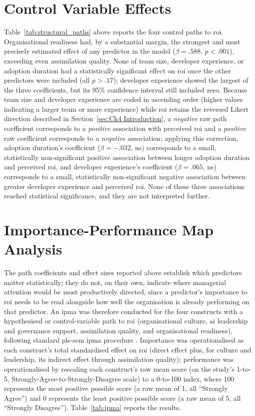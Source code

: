 \section{Control Variable Effects}
\label{sec:Control Variable Effects}
Table~\ref{tab:structural_paths} above reports the four control paths to \gls{roi}. Organisational readiness had, by a substantial margin, the strongest and most precisely estimated effect of any predictor in the model ($\beta = .588$, $p < .001$), exceeding even assimilation quality. None of team size, developer experience, or adoption duration had a statistically significant effect on \gls{roi} once the other predictors were included (all $p > .17$); developer experience showed the largest of the three coefficients, but its 95\% confidence interval still included zero. Because team size and developer experience are coded in ascending order (higher values indicating a larger team or more experience) while \gls{roi} retains the reversed Likert direction described in Section~\ref{sec:Ch4 Introduction}, a \emph{negative} raw path coefficient corresponds to a \emph{positive} association with perceived \gls{roi} and a \emph{positive} raw coefficient corresponds to a \emph{negative} association; applying this correction, adoption duration's coefficient ($\beta = -.032$, ns) corresponds to a small, statistically non-significant positive association between longer adoption duration and perceived \gls{roi}, and developer experience's coefficient ($\beta = .065$, ns) corresponds to a small, statistically non-significant negative association between greater developer experience and perceived \gls{roi}. None of these three associations reached statistical significance, and they are not interpreted further.

\section{Importance-Performance Map Analysis}
\label{sec:IPMA}
The path coefficients and effect sizes reported above establish which predictors matter statistically; they do not, on their own, indicate where managerial attention would be most productively directed, since a predictor's importance to \gls{roi} needs to be read alongside how well the organisation is already performing on that predictor. An \gls{ipma} was therefore conducted for the four constructs with a hypothesised or control-variable path to \gls{roi} (organisational culture, \gls{ai} leadership and governance support, assimilation quality, and organisational readiness), following standard \gls{pls-sem} \gls{ipma} procedure \autocite{Hair2019}. Importance was operationalised as each construct's total standardised effect on \gls{roi} (direct effect plus, for culture and leadership, its indirect effect through assimilation quality); performance was operationalised by rescaling each construct's raw mean score (on the study's 1-to-5, Strongly-Agree-to-Strongly-Disagree scale) to a 0-to-100 index, where 100 represents the most positive possible score (a raw mean of 1, all ``Strongly Agree'') and 0 represents the least positive possible score (a raw mean of 5, all ``Strongly Disagree''). Table~\ref{tab:ipma} reports the results.

